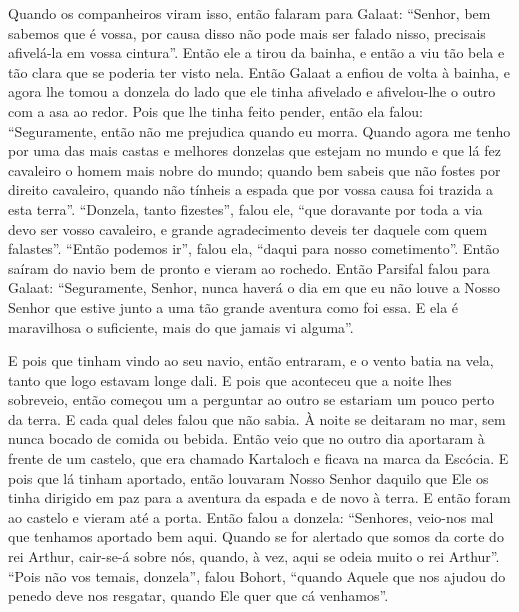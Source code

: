 Quando os companheiros viram isso, então falaram para Galaat: “Senhor, bem
sabemos que é vossa, por causa disso não pode mais ser falado nisso, precisais
afivelá-la em vossa cintura”. Então ele a tirou da bainha, e então a viu tão
bela e tão clara que se poderia ter visto nela. Então Galaat a enfiou de volta
à bainha, e agora lhe tomou a donzela do lado que ele tinha afivelado e
afivelou-lhe o outro com a asa ao redor. Pois que lhe tinha feito pender, então
ela falou: “Seguramente, então não me prejudica quando eu morra. Quando agora
me tenho por uma das mais castas e melhores donzelas que estejam no mundo e que
lá fez cavaleiro o homem mais nobre do mundo; quando bem sabeis que não fostes
por direito cavaleiro, quando não tínheis a espada que por vossa causa foi
trazida a esta terra”. “Donzela, tanto fizestes”, falou ele, “que doravante por
toda a via devo ser vosso cavaleiro, e grande agradecimento deveis ter daquele
com quem falastes”. “Então podemos ir”, falou ela, “daqui para nosso
cometimento”. Então saíram do navio bem de pronto e vieram ao rochedo. Então
Parsifal falou para Galaat: “Seguramente, Senhor, nunca haverá o dia em que eu
não louve a Nosso Senhor que estive junto a uma tão grande aventura como foi
essa. E ela é maravilhosa o suficiente, mais do que jamais vi alguma”.

E pois que tinham vindo ao seu navio, então entraram, e o vento batia na vela,
tanto que logo estavam longe dali. E pois que aconteceu que a noite lhes
sobreveio, então começou um a perguntar ao outro se estariam um pouco perto da
terra. E cada qual deles falou que não sabia. À noite se deitaram no mar, sem
nunca bocado de comida ou bebida. Então veio que no outro dia aportaram à
frente de um castelo, que era chamado Kartaloch e ficava na marca da Escócia. E
pois que lá tinham aportado,  então louvaram Nosso Senhor daquilo que Ele os
tinha dirigido em paz para a aventura da espada e de novo à terra. E então
foram ao castelo e vieram até a porta. Então falou a donzela: “Senhores,
veio-nos mal que tenhamos aportado bem aqui. Quando se for alertado que somos
da corte do rei Arthur, cair-se-á sobre nós, quando, à vez, aqui se odeia muito
o rei Arthur”. “Pois não vos temais, donzela”, falou Bohort, “quando Aquele que
nos ajudou do penedo deve nos resgatar, quando Ele quer que cá venhamos”.

